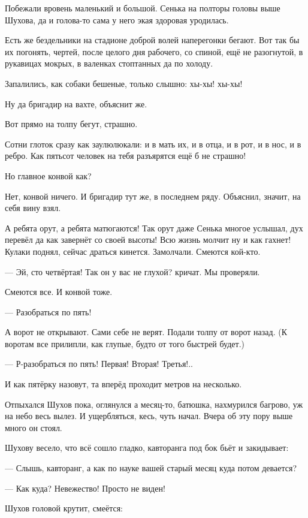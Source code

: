 Побежали вровень \dash маленький и большой. Сенька на полторы головы выше Шухова, да и голова-то
сама у него экая здоровая уродилась.

Есть же бездельники \dash на стадионе доброй волей наперегонки бегают. Вот так бы их погонять,
чертей, после целого дня рабочего, со спиной, ещё не разогнутой, в рукавицах мокрых, в
валенках стоптанных \dash да по холоду.

Запалились, как собаки бешеные, только слышно: хы-хы! хы-хы!

Ну да бригадир на вахте, объяснит же.

Вот прямо на толпу бегут, страшно.

Сотни глоток сразу как заулюлюкали: и в мать их, и в отца, и в рот, и в нос, и в ребро. Как
пятьсот человек на тебя разъярятся \dash ещё б не страшно!

Но главное \dash конвой как?

Нет, конвой ничего. И бригадир тут же, в последнем ряду. Объяснил, значит, на себя вину взял.

А ребята орут, а ребята матюгаются! Так орут \dash даже Сенька многое услышал, дух перевёл да как
завернёт со своей высоты! Всю жизнь молчит \dash ну и как гахнет! Кулаки поднял, сейчас драться
кинется. Замолчали. Смеются кой-кто.

--- Эй, сто четвёртая! Так он у вас не глухой? \dash кричат. \Dash Мы проверяли.

Смеются все. И конвой тоже.

--- Разобраться по пять!

А ворот не открывают. Сами себе не верят. Подали толпу от ворот назад. (К воротам все прилипли,
как глупые, будто от того быстрей будет.)

--- Р-разобраться по пять! Первая! Вторая! Третья!..

И как пятёрку назовут, та вперёд проходит метров на несколько.

Отпыхался Шухов пока, оглянулся \dash а месяц-то, батюшка, нахмурился багрово, уж на небо весь
вылез. И ущербляться, кесь, чуть начал. Вчера об эту пору выше много он стоял.

Шухову весело, что всё сошло гладко, кавторанга под бок бьёт и закидывает:

--- Слышь, кавторанг, а как по науке вашей \dash старый месяц куда потом девается?

--- Как куда? Невежество! Просто не виден!

Шухов головой крутит, смеётся:

